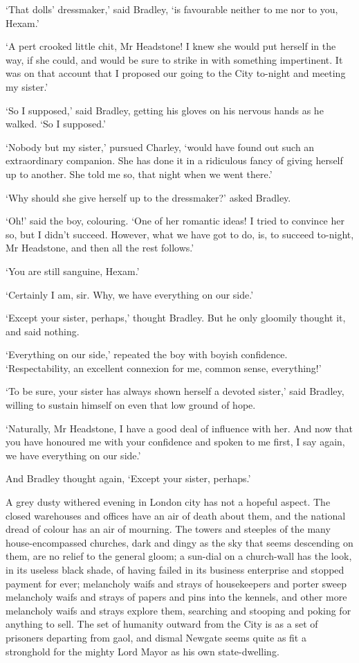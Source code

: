 ‘That dolls’ dressmaker,’ said Bradley, ‘is favourable neither to me nor
to you, Hexam.’

‘A pert crooked little chit, Mr Headstone! I knew she would put herself
in the way, if she could, and would be sure to strike in with something
impertinent. It was on that account that I proposed our going to the
City to-night and meeting my sister.’

‘So I supposed,’ said Bradley, getting his gloves on his nervous hands
as he walked. ‘So I supposed.’

‘Nobody but my sister,’ pursued Charley, ‘would have found out such an
extraordinary companion. She has done it in a ridiculous fancy of giving
herself up to another. She told me so, that night when we went there.’

‘Why should she give herself up to the dressmaker?’ asked Bradley.

‘Oh!’ said the boy, colouring. ‘One of her romantic ideas! I tried to
convince her so, but I didn’t succeed. However, what we have got to do,
is, to succeed to-night, Mr Headstone, and then all the rest follows.’

‘You are still sanguine, Hexam.’

‘Certainly I am, sir. Why, we have everything on our side.’

‘Except your sister, perhaps,’ thought Bradley. But he only gloomily
thought it, and said nothing.

‘Everything on our side,’ repeated the boy with boyish confidence.
‘Respectability, an excellent connexion for me, common sense,
everything!’

‘To be sure, your sister has always shown herself a devoted sister,’
said Bradley, willing to sustain himself on even that low ground of
hope.

‘Naturally, Mr Headstone, I have a good deal of influence with her.
And now that you have honoured me with your confidence and spoken to me
first, I say again, we have everything on our side.’

And Bradley thought again, ‘Except your sister, perhaps.’

A grey dusty withered evening in London city has not a hopeful aspect.
The closed warehouses and offices have an air of death about them, and
the national dread of colour has an air of mourning. The towers and
steeples of the many house-encompassed churches, dark and dingy as the
sky that seems descending on them, are no relief to the general gloom;
a sun-dial on a church-wall has the look, in its useless black shade, of
having failed in its business enterprise and stopped payment for ever;
melancholy waifs and strays of housekeepers and porter sweep melancholy
waifs and strays of papers and pins into the kennels, and other more
melancholy waifs and strays explore them, searching and stooping and
poking for anything to sell. The set of humanity outward from the City
is as a set of prisoners departing from gaol, and dismal Newgate
seems quite as fit a stronghold for the mighty Lord Mayor as his own
state-dwelling.

